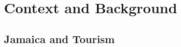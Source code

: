 \documentclass[12pt]{article}
\begin{document}

                                                                                                                                                                                                                                                          



	\section{Context and Background}
	\label{section:context}

	\subsection{Jamaica and Tourism}
	\label{subsec:jamaica_tourism}
\end{document}
